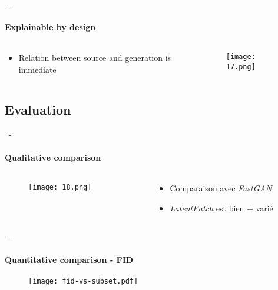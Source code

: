 \documentclass[aspectratio=169, 22pt]{beamer}
\begin{document}
\begin{frame}{\secname~- \subsecname}
  \framesubtitle{Explainable by design}
  \begin{columns}
    \begin{column}{0.4\linewidth}
      \begin{itemize}
      \item Relation between \alert{source} and \alert{generation} is immediate
      \end{itemize}
    \end{column}
    \begin{column}{0.6\linewidth}
      \begin{figure}
        \texttt{[image: 17.png]}
      \end{figure}  
    \end{column}
  \end{columns}  
\end{frame}

\subsection{Evaluation}
\begin{frame}{\secname~- \subsecname}
  \framesubtitle{Qualitative comparison}
  \begin{columns}
    \begin{column}{0.75\linewidth}
      \begin{figure}
        \texttt{[image: 18.png]}
      \end{figure}
    \end{column}
    \begin{column}{0.25\linewidth}
      \begin{itemize}
      \item Comparaison avec \emph{FastGAN}
      \item \emph{LatentPatch} est bien + varié
      \end{itemize}
    \end{column}
  \end{columns}  
\end{frame}

\begin{frame}{\secname~- \subsecname}
  \framesubtitle{Quantitative comparison - FID}
  \begin{figure}
    \texttt{[image: fid-vs-subset.pdf]}
  \end{figure}
\end{frame}
\end{document}
